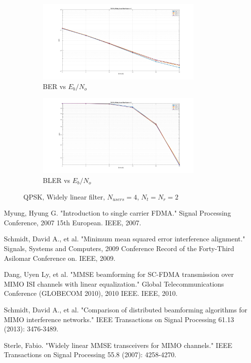 \documentclass[12pt,a4paper,notitlepage,twoside,headsepline]{scrartcl}
\begin{document}
\begin{figure}
\centering
\begin{subfigure}{.5\textwidth}
  \centering
  \includegraphics[width=0.9\textwidth]{figures/Wl_nu4_ber}
  \caption{BER vs $E_b/N_o$} 
  \label{fig:example}
\end{subfigure}%
\begin{subfigure}{.5\textwidth}
  \centering
  \includegraphics[width=0.9\textwidth]{figures/Wl_nu4_bler}
  \caption{BLER vs $E_b/N_o$}
  \label{fig:example}
\end{subfigure}
\caption{QPSK, Widely linear filter, $N_{users} = 4$, $N_t = N_r = 2$}
\label{fig:test}
\end{figure}
\begin{thebibliography}{Kop96}
Myung, Hyung G. "Introduction to single carrier FDMA." Signal Processing Conference, 2007 15th European. IEEE, 2007.


Schmidt, David A., et al. "Minimum mean squared error interference alignment." Signals, Systems and Computers, 2009 Conference Record of the Forty-Third Asilomar Conference on. IEEE, 2009.

Dang, Uyen Ly, et al. "MMSE beamforming for SC-FDMA transmission over MIMO ISI channels with linear equalization." Global Telecommunications Conference (GLOBECOM 2010), 2010 IEEE. IEEE, 2010.	

Schmidt, David A., et al. "Comparison of distributed beamforming algorithms for MIMO interference networks." IEEE Transactions on Signal Processing 61.13 (2013): 3476-3489.

Sterle, Fabio. "Widely linear MMSE transceivers for MIMO channels." IEEE Transactions on Signal Processing 55.8 (2007): 4258-4270.



\end{thebibliography}



\end{document}

